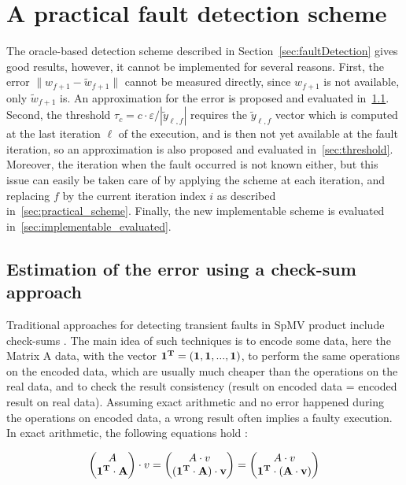 \documentclass[twoside]{article}
\begin{document}
  \section{A practical fault detection scheme}
  The oracle-based detection scheme described in Section~\ref{sec:faultDetection} gives good results, however, it cannot be implemented for several reasons. First, the error $\|{w}_{f+1} - \widetilde{w}_{f+1}\|$ cannot be measured directly, since $w_{f+1}$ is not available, only $\widetilde{w}_{f+1}$ is. An approximation for the error is proposed and evaluated in~\ref{sec:checksum}. Second, the threshold $\tau_c = c \cdot \varepsilon / |\widetilde{y}_{\ell, f}|$ requires the $\widetilde{y}_{\ell, f}$ vector which is computed at the last iteration $\ell$ of the execution, and is then not yet available at the fault iteration, so an approximation is also proposed and evaluated in~\ref{sec:threshold}. Moreover, the iteration when the fault occurred is not known either, but this issue can easily be taken care of by applying the scheme at each iteration, and replacing $f$ by the current iteration index $i$ as described in~\ref{sec:practical_scheme}. Finally, the new implementable scheme is evaluated in~\ref{sec:implementable_evaluated}.

  \subsection{Estimation of the error using a check-sum approach}\label{sec:checksum}
  Traditional approaches for detecting transient faults in SpMV product include check-sums \cite{checksum}. The main idea of such techniques is to encode some data, here the Matrix A data, with the vector $\bf{1}^T = (1, 1,..., 1)$, to perform the same operations on the encoded data, which are usually much cheaper than the operations on the real data, and to check the result consistency (result on encoded data = encoded result on real data). Assuming exact arithmetic and no error happened during the operations on encoded data, a wrong result often implies a faulty execution. 
  In exact arithmetic, the following equations hold :


  \begin{equation}
    \begin{pmatrix}
      A  \\
      \bf{1}^T \cdot A 
    \end{pmatrix} \cdot
    v
    =  \begin{pmatrix}
      A \cdot v \\
      (\bf{1}^T \cdot A) \cdot v
    \end{pmatrix} 
    =  \begin{pmatrix}
      A \cdot v \\
      \bf{1}^T \cdot (A \cdot v)
    \end{pmatrix} 
  \end{equation}
\end{document}
